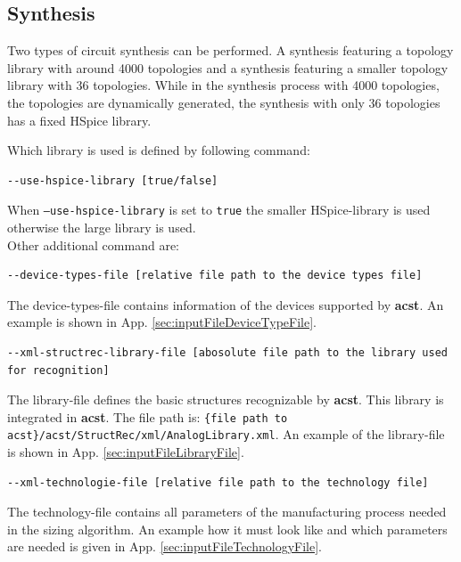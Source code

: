 \subsection{Synthesis}\label{sec:commandsSynthesis}
Two types of circuit synthesis can be performed. A synthesis featuring a  topology library with around 4000 topologies and a synthesis featuring a smaller topology library with 36 topologies. While in the synthesis process with 4000 topologies, the topologies are dynamically generated, the synthesis with only 36 topologies has a fixed HSpice library.

Which library is used is defined by following command:
\begin{lstlisting}[basicstyle=\ttfamily\scriptsize,backgroundcolor={\color{gray!30}}, escapechar=? ]
--use-hspice-library [true/false]
\end{lstlisting}
When {\tt --use-hspice-library} is set to {\tt true} the smaller HSpice-library is used otherwise the large library is used.
\\

Other additional command are:
\begin{lstlisting}[basicstyle=\ttfamily\scriptsize,backgroundcolor={\color{gray!30}}, escapechar=? ]
--device-types-file [relative file path to the device types file]
\end{lstlisting}
The device-types-file contains information of the devices supported by {\bf acst}. An example is shown in App. \ref{sec:inputFileDeviceTypeFile}.
\\

\begin{lstlisting}[basicstyle=\ttfamily\scriptsize,backgroundcolor={\color{gray!30}}, escapechar=? ]
--xml-structrec-library-file [abosolute file path to the library used for recognition] 
\end{lstlisting}
The library-file defines the basic structures recognizable by {\bf acst}. This library is integrated in {\bf acst}. The file path is: {\tt \{file path to acst\}/acst/StructRec/xml/AnalogLibrary.xml}. An example of the library-file is shown in App. \ref{sec:inputFileLibraryFile}.
\\

\begin{lstlisting}[basicstyle=\ttfamily\scriptsize,backgroundcolor={\color{gray!30}}, escapechar=? ]
--xml-technologie-file [relative file path to the technology file] 
\end{lstlisting}
The technology-file contains all parameters of the manufacturing process needed in the sizing algorithm. An example how it must look like and which parameters are needed is given in App. \ref{sec:inputFileTechnologyFile}.


